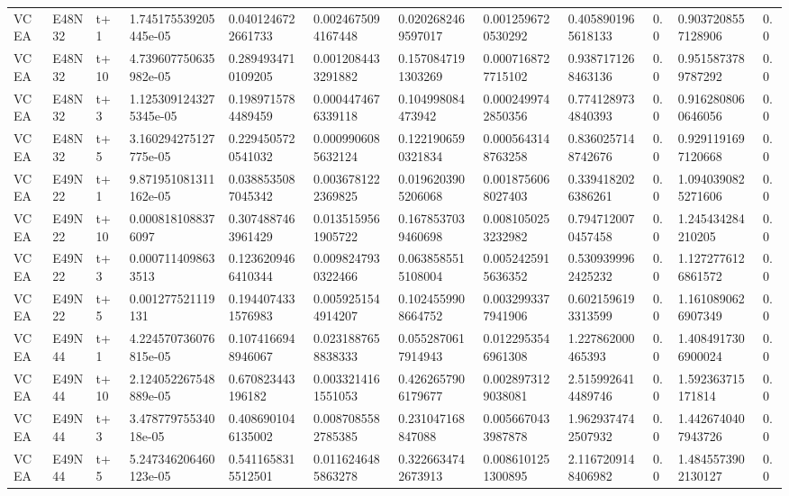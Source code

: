\begin{landscape}
\begin{longtable}{llllllllllll}
VCEA & E48N32 & t+1 & 1.745175539205445e-05 & 0.0401246722661733 & 0.0024675094167448 & 0.0202682469597017 & 0.0012596720530292 & 0.4058901965618133 & 0.0 & 0.9037208557128906 & 0.0 \\
VCEA & E48N32 & t+10 & 4.739607750635982e-05 & 0.2894934710109205 & 0.0012084433291882 & 0.1570847191303269 & 0.0007168727715102 & 0.9387171268463136 & 0.0 & 0.9515873789787292 & 0.0 \\
VCEA & E48N32 & t+3 & 1.1253091243275345e-05 & 0.1989715784489459 & 0.0004474676339118 & 0.104998084473942 & 0.0002499742850356 & 0.7741289734840393 & 0.0 & 0.9162808060646056 & 0.0 \\
VCEA & E48N32 & t+5 & 3.160294275127775e-05 & 0.2294505720541032 & 0.0009906085632124 & 0.1221906590321834 & 0.0005643148763258 & 0.8360257148742676 & 0.0 & 0.9291191697120668 & 0.0 \\
VCEA & E49N22 & t+1 & 9.871951081311162e-05 & 0.0388535087045342 & 0.0036781222369825 & 0.0196203905206068 & 0.0018756068027403 & 0.3394182026386261 & 0.0 & 1.0940390825271606 & 0.0 \\
VCEA & E49N22 & t+10 & 0.0008181088376097 & 0.3074887463961429 & 0.0135159561905722 & 0.1678537039460698 & 0.0081050253232982 & 0.7947120070457458 & 0.0 & 1.245434284210205 & 0.0 \\
VCEA & E49N22 & t+3 & 0.0007114098633513 & 0.1236209466410344 & 0.0098247930322466 & 0.0638585515108004 & 0.0052425915636352 & 0.5309399962425232 & 0.0 & 1.1272776126861572 & 0.0 \\
VCEA & E49N22 & t+5 & 0.001277521119131 & 0.1944074331576983 & 0.0059251544914207 & 0.1024559908664752 & 0.0032993377941906 & 0.6021596193313599 & 0.0 & 1.1610890626907349 & 0.0 \\
VCEA & E49N44 & t+1 & 4.224570736076815e-05 & 0.1074166948946067 & 0.0231887658838333 & 0.0552870617914943 & 0.0122953546961308 & 1.227862000465393 & 0.0 & 1.4084917306900024 & 0.0 \\
VCEA & E49N44 & t+10 & 2.124052267548889e-05 & 0.670823443196182 & 0.0033214161551053 & 0.4262657906179677 & 0.0028973129038081 & 2.5159926414489746 & 0.0 & 1.592363715171814 & 0.0 \\
VCEA & E49N44 & t+3 & 3.47877975534018e-05 & 0.4086901046135002 & 0.0087085582785385 & 0.231047168847088 & 0.0056670433987878 & 1.9629374742507932 & 0.0 & 1.4426740407943726 & 0.0 \\
VCEA & E49N44 & t+5 & 5.247346206460123e-05 & 0.5411658315512501 & 0.0116246485863278 & 0.3226634742673913 & 0.0086101251300895 & 2.1167209148406982 & 0.0 & 1.4845573902130127 & 0.0 \\

\end{longtable}
\end{landscape}
